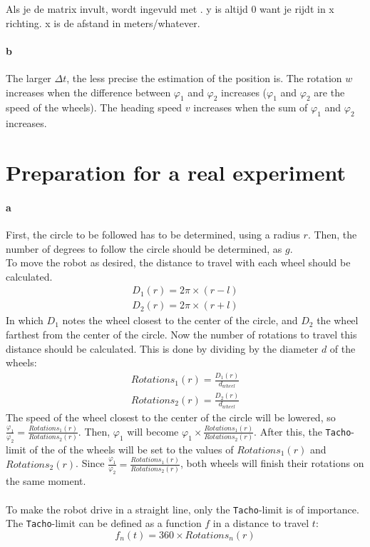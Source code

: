 \documentclass[12pt]{article}
\begin{document}
Als je de matrix invult, wordt \theta ingevuld met \omega. y is altijd 0 want je rijdt in x richting. x is de afstand in meters/whatever.

\paragraph{b} The larger ${\Delta}t$, the less precise the estimation of the position is. The rotation $w$ increases when the difference between $\varphi_1$ and $\varphi_2$ increases ($\varphi_1$ and $\varphi_2$ are the speed of the wheels). The heading speed $v$ increases when the sum of $\varphi_1$ and $\varphi_2$ increases.
\clearpage
\section{Preparation for a real experiment}
\paragraph{a} First, the circle to be followed has to be determined, using a radius $r$. Then, the number of degrees to follow the circle should be determined, as $g$. \\ 
To move the robot as desired, the distance to travel with each wheel should be calculated. 
\begin{equation}
\begin{split}
    D_1(r) = 2\pi \times (r - l) \\
    D_2(r) = 2\pi \times (r + l)
\end{split}
\end{equation}
In which $D_1$ notes the wheel closest to the center of the circle, and $D_2$ the wheel farthest from the center of the circle. Now the number of rotations to travel this distance should be calculated. This is done by dividing by the diameter $d$ of the wheels:
\begin{equation}
\begin{split}
    Rotations_1(r) = \frac{D_1(r)}{d_{wheel}} \\
    Rotations_2(r) = \frac{D_2(r)}{d_{wheel}}
\end{split}
\end{equation}
The speed of the wheel closest to the center of the circle will be lowered, so $\frac{\varphi_1}{\varphi_2} = \frac{Rotations_1(r)}{Rotations_2(r)}$. Then, $\varphi_1$ will become $\varphi_1 \times \frac{Rotations_1(r)}{Rotations_2(r)}$. After this, the \verb|Tacho|-limit of the of the wheels will be set to the values of $Rotations_1(r)$ and $Rotations_2(r)$. Since $\frac{\varphi_1}{\varphi_2} = \frac{Rotations_1(r)}{Rotations_2(r)}$, both wheels will finish their rotations on the same moment. \\ \\
To make the robot drive in a straight line, only the \verb|Tacho|-limit is of importance. The \verb|Tacho|-limit can be defined as a function $f$ in a distance to travel $t$:
\begin{equation}
    f_n(t) = 360 \times Rotations_n(r)
\end{equation}
\end{document}
